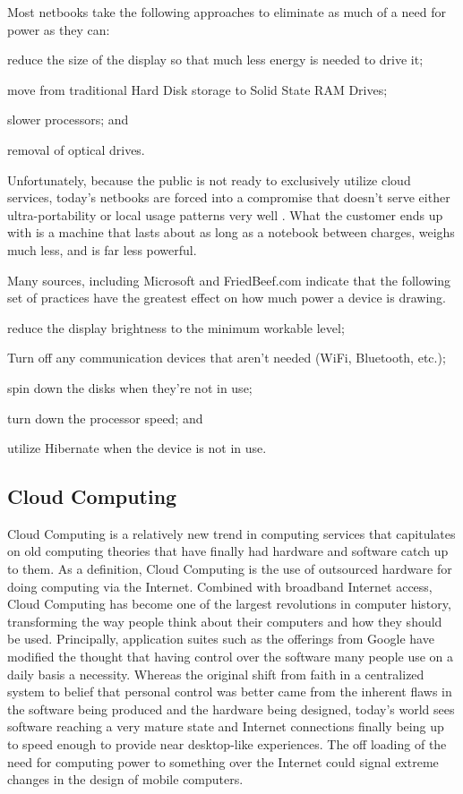 Most netbooks take the following approaches to eliminate as much of a need for
power as they can:
\begin{inparaenum}[(1)]
\item reduce the size of the display so that much less energy is needed to drive
  it;
\item move from traditional Hard Disk storage to Solid State RAM Drives;
\item slower processors; and
\item removal of optical drives.
\end{inparaenum}
Unfortunately, because the public is not ready to exclusively utilize cloud
services, today's netbooks are forced into a compromise that doesn't serve
either ultra-portability or local usage patterns very well \citep{gladstone09}.
What the customer ends up with is a machine that lasts about as long as a
notebook between charges, weighs much less, and is far less powerful.

Many sources, including Microsoft \citeyearpar{microsoftBattery} and
FriedBeef.com \citeyearpar{yeang2007} indicate that the following set of
practices have the greatest effect on how much power a device is drawing.
\begin{inparaenum}[(1)]
\item reduce the display brightness to the minimum workable level;
\item Turn off any communication devices that aren't needed (WiFi, Bluetooth, etc.);
\item spin down the disks when they're not in use;
\item turn down the processor speed; and
\item utilize Hibernate when the device is not in use.
\end{inparaenum}

\subsection{Cloud Computing}

Cloud Computing is a relatively new trend in computing services that capitulates
on old computing theories that have finally had hardware and software catch up
to them.  As a definition, Cloud Computing is the use of outsourced hardware for
doing computing via the Internet.  Combined with broadband Internet access,
Cloud Computing has become one of the largest revolutions in computer history,
transforming the way people think about their computers and how they should be
used.  Principally, application suites such as the offerings from Google have
modified the thought that having control over the software many people use on a
daily basis a necessity.  Whereas the original shift from faith in a centralized
system to belief that personal control was better came from the inherent flaws
in the software being produced and the hardware being designed, today's world
sees software reaching a very mature state and Internet connections finally
being up to speed enough to provide near desktop-like experiences.  The off
loading of the need for computing power to something over the Internet could
signal extreme changes in the design of mobile computers.

